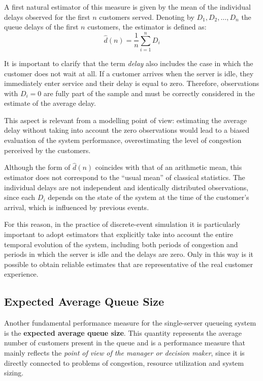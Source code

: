 A first natural estimator of this measure is given by the mean of the individual delays observed for the first $n$ customers served. Denoting by $D_1, D_2, \dots, D_n$ the queue delays of the first $n$ customers, the estimator is defined as:
\[
\hat{d}(n) = \frac{1}{n} \sum_{i=1}^{n} D_i
\]

It is important to clarify that the term \emph{delay} also includes the case in which the customer does not wait at all. If a customer arrives when the server is idle, they immediately enter service and their delay is equal to zero. Therefore, observations with $D_i = 0$ are fully part of the sample and must be correctly considered in the estimate of the average delay.

This aspect is relevant from a modelling point of view: estimating the average delay without taking into account the zero observations would lead to a biased evaluation of the system performance, overestimating the level of congestion perceived by the customers.

Although the form of $\hat{d}(n)$ coincides with that of an arithmetic mean, this estimator does not correspond to the ``usual mean'' of classical statistics. The individual delays are not independent and identically distributed observations, since each $D_i$ depends on the state of the system at the time of the customer's arrival, which is influenced by previous events.

For this reason, in the practice of discrete-event simulation it is particularly important to adopt estimators that explicitly take into account the entire temporal evolution of the system, including both periods of congestion and periods in which the server is idle and the delays are zero. Only in this way is it possible to obtain reliable estimates that are representative of the real customer experience.

\subsection{Expected Average Queue Size}

Another fundamental performance measure for the single-server queueing system is the \textbf{expected average queue size}. This quantity represents the average number of customers present in the queue and is a performance measure that mainly reflects the \emph{point of view of the manager or decision maker}, since it is directly connected to problems of congestion, resource utilization and system sizing.


